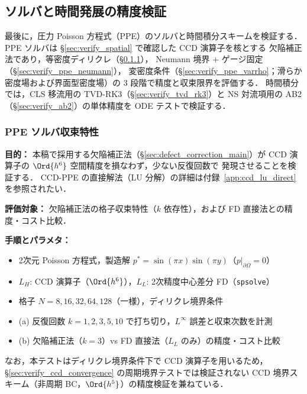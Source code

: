 %
\subsection{ソルバと時間発展の精度検証}
\label{sec:verify_solver}

最後に，圧力 Poisson 方程式（PPE）のソルバと時間積分スキームを検証する．
PPE ソルバは §\ref{sec:verify_spatial} で確認した CCD 演算子を核とする
欠陥補正法であり，等密度ディリクレ（§\ref{sec:verify_ppe}），
Neumann 境界 + ゲージ固定（§\ref{sec:verify_ppe_neumann}），
変密度条件（§\ref{sec:verify_ppe_varrho}；滑らか密度場および界面型密度場）の 3 段階で精度と収束限界を評価する．
時間積分では，CLS 移流用の TVD-RK3（§\ref{sec:verify_tvd_rk3}）と
NS 対流項用の AB2（§\ref{sec:verify_ab2}）の単体精度を ODE テストで検証する．

\subsubsection{PPE ソルバ収束特性}
\label{sec:verify_ppe}

\noindent\textbf{目的：}
本稿で採用する欠陥補正法（§\ref{sec:defect_correction_main}）が
CCD 演算子の $\Ord{h^6}$ 空間精度を損なわず，少ない反復回数で
発現させることを検証する．
CCD-PPE の直接解法（LU 分解）の詳細は付録~\ref{app:ccd_lu_direct} を参照されたい．

\noindent\textbf{評価対象：}
欠陥補正法の格子収束特性（$k$ 依存性），および FD 直接法との精度・コスト比較．

\noindent\textbf{手順とパラメタ：}
\begin{itemize}[noitemsep]
  \item 2次元 Poisson 方程式，製造解 $p^* = \sin(\pi x)\sin(\pi y)$（$p|_{\partial\Omega}=0$）
  \item $L_H$: CCD 演算子（$\Ord{h^6}$），$L_L$: 2次精度中心差分 FD（\texttt{spsolve}）
  \item 格子 $N = 8, 16, 32, 64, 128$（一様），ディリクレ境界条件
  \item (a) 反復回数 $k = 1, 2, 3, 5, 10$ で打ち切り，$L^\infty$ 誤差と収束次数を計測
  \item (b) 欠陥補正法（$k=3$）vs FD 直接法（$L_L$ のみ）の精度・コスト比較
\end{itemize}
なお，本テストはディリクレ境界条件下で CCD 演算子を用いるため，
§\ref{sec:verify_ccd_convergence} の周期境界テストでは検証されない
CCD 境界スキーム（非周期 BC，$\Ord{h^5}$）の精度検証を兼ねている．

